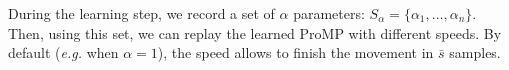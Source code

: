 \documentclass[utf8]{frontiersSCNS} %
\newcommand{\todo}[1]{\textcolor{red}{\textbf{/*#1*/}}}
\begin{document}
%
%
%
%

During the learning step, we record a set of $\alpha$ parameters: $S_{\alpha} = \{\alpha_{1},\ldots,\alpha_{n}\}$.
Then, using this set, we can replay the learned ProMP with different speeds. By default (\textit{e.g.} when $\alpha=1$), the speed allows to finish the movement in $\bar{s}$ samples.
\end{document}
